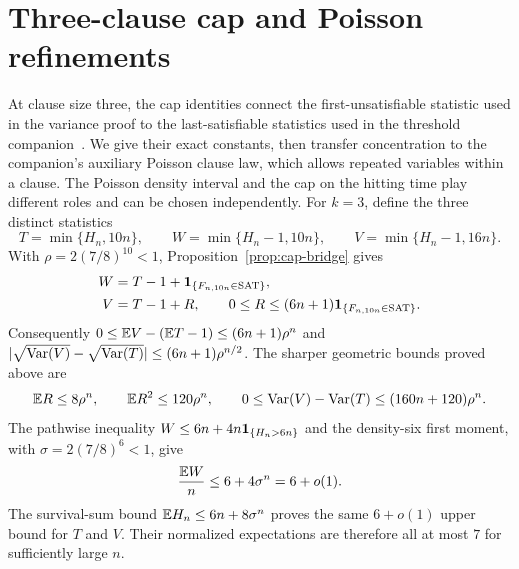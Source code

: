 \section{Three-clause cap and Poisson refinements}
\label{sec:three-clause-refinements}

At clause size three, the cap identities connect the first-unsatisfiable
statistic used in the variance proof to the last-satisfiable statistics
used in the threshold companion~\cite{FixedKThreshold}. We give their
exact constants, then transfer concentration to the companion's auxiliary
Poisson clause law, which allows repeated variables within a clause.
The Poisson density interval and the cap on the hitting time play
different roles and can be chosen independently.
For $k=3$, define the three distinct statistics
\[
 T=\min\{H_n,10n\},\qquad
 W=\min\{H_n-1,10n\},\qquad
 V=\min\{H_n-1,16n\}.
\]
With $\rho=2(7/8)^{10}<1$, Proposition~\ref{prop:cap-bridge} gives
\begin{align}
 W&=T-1+\mathbf 1_{\{F_{n,10n}\in\mathrm{SAT}\}},\label{eq:three-same-cap}\\
 V&=T-1+R,\qquad
 0\le R\le(6n+1)\mathbf 1_{\{F_{n,10n}\in\mathrm{SAT}\}}.
 \label{eq:three-cross-cap}
\end{align}
Consequently $0\le\mathbb E V-(\mathbb E T-1)\le(6n+1)\rho^n$ and
$|\sqrt{\operatorname{Var}(V)}-\sqrt{\operatorname{Var}(T)}|\le(6n+1)\rho^{n/2}$.
The sharper geometric bounds proved above are
\[
 \mathbb E R\le8\rho^n,\qquad \mathbb E R^2\le120\rho^n,\qquad
 0\le\operatorname{Var}(V)-\operatorname{Var}(T)\le(160n+120)\rho^n.
\]
The pathwise inequality $W\le6n+4n\mathbf 1_{\{H_n>6n\}}$ and the
density-six first moment, with $\sigma=2(7/8)^6<1$, give
\begin{equation}\label{eq:three-center-upper}
 \frac{\mathbb E W}{n}\le6+4\sigma^n=6+o(1).
\end{equation}
The survival-sum bound $\mathbb E H_n\le6n+8\sigma^n$ proves the same
$6+o(1)$ upper bound for $T$ and $V$. Their normalized expectations are
therefore all at most $7$ for sufficiently large $n$.

